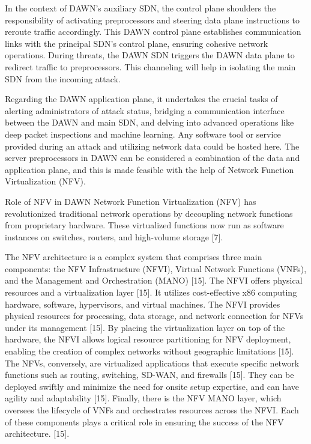 \documentclass[conference]{IEEEtran}
\begin{document}
In the context of DAWN's auxiliary SDN, the control plane shoulders the responsibility of activating preprocessors and steering data plane instructions to reroute traffic accordingly. This DAWN control plane establishes communication links with the principal SDN's control plane, ensuring cohesive network operations. During threats, the DAWN SDN triggers the DAWN data plane to redirect traffic to preprocessors. This channeling will help in isolating the main SDN from the incoming attack.

Regarding the DAWN application plane, it undertakes the crucial tasks of alerting administrators of attack status, bridging a communication interface between the DAWN and main SDN, and delving into advanced operations like deep packet inspections and machine learning. Any software tool or service provided during an attack and utilizing network data could be hosted here. The server preprocessors in DAWN can be considered a combination of the data and application plane, and this is made feasible with the help of Network Function Virtualization (NFV). 

Role of NFV in DAWN
Network Function Virtualization (NFV) has revolutionized traditional network operations by decoupling network functions from proprietary hardware. These virtualized functions now run as software instances on switches, routers, and high-volume storage [7]. 

The NFV architecture is a complex system that comprises three main components: the NFV Infrastructure (NFVI), Virtual Network Functions (VNFs), and the Management and Orchestration (MANO) [15]. The NFVI offers physical resources and a virtualization layer [15]. It utilizes cost-effective x86 computing hardware, software, hypervisors, and virtual machines. The NFVI provides physical resources for processing, data storage, and network connection for NFVs under its management [15]. By placing the virtualization layer on top of the hardware, the NFVI allows logical resource partitioning for NFV deployment, enabling the creation of complex networks without geographic limitations [15]. 
The NFVs, conversely, are virtualized applications that execute specific network functions such as routing, switching, SD-WAN, and firewalls [15]. They can be deployed swiftly and minimize the need for onsite setup expertise, and can have agility and adaptability [15]. Finally, there is the NFV MANO layer, which oversees the lifecycle of VNFs and orchestrates resources across the NFVI. Each of these components plays a critical role in ensuring the success of the NFV architecture.
[15].
\end{document}
